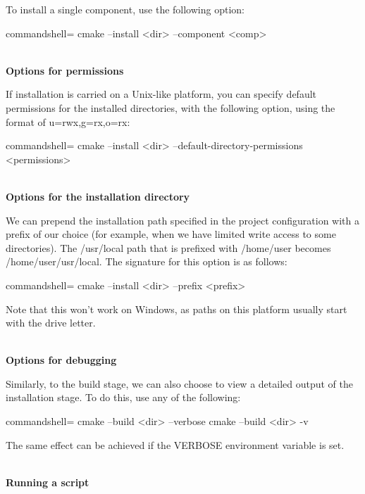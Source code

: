 To install a single component, use the following option:

\begin{tcblisting}{commandshell={}}
cmake --install <dir> --component <comp>
\end{tcblisting}

\hspace*{\fill} \\ %
\noindent
\textbf{Options for permissions}

If installation is carried on a Unix-like platform, you can specify default permissions for the installed directories, with the following option, using the format of u=rwx,g=rx,o=rx:

\begin{tcblisting}{commandshell={}}
cmake --install <dir>
  --default-directory-permissions <permissions>
\end{tcblisting}

\hspace*{\fill} \\ %
\noindent
\textbf{Options for the installation directory}

We can prepend the installation path specified in the project configuration with a prefix of our choice (for example, when we have limited write access to some directories). The /usr/local path that is prefixed with /home/user becomes /home/user/usr/local. The signature for this option is as follows:

\begin{tcblisting}{commandshell={}}
cmake --install <dir> --prefix <prefix>
\end{tcblisting}

Note that this won't work on Windows, as paths on this platform usually start with the drive letter.

\hspace*{\fill} \\ %
\noindent
\textbf{Options for debugging}

Similarly, to the build stage, we can also choose to view a detailed output of the installation stage. To do this, use any of the following:

\begin{tcblisting}{commandshell={}}
cmake --build <dir> --verbose
cmake --build <dir> -v
\end{tcblisting}

The same effect can be achieved if the VERBOSE environment variable is set.

\hspace*{\fill} \\ %
\noindent
\textbf{Running a script}
 
